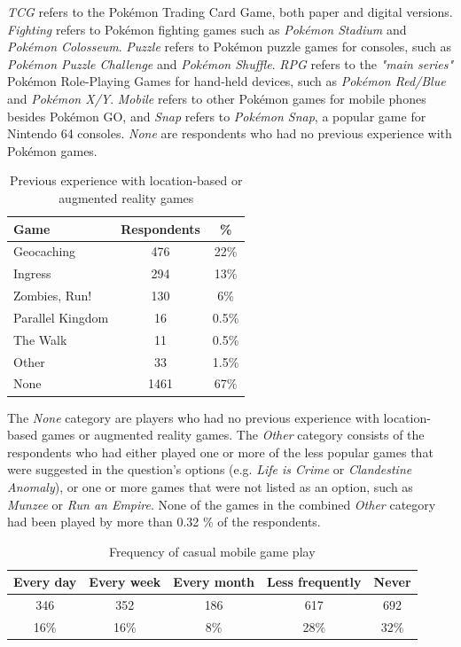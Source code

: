 \emph{TCG} refers to the Pokémon Trading Card Game, both paper and digital versions. \emph{Fighting} refers to Pokémon fighting games such as \emph{Pokémon Stadium} and \emph{Pokémon Colosseum}. \emph{Puzzle} refers to Pokémon puzzle games for consoles, such as \emph{Pokémon Puzzle Challenge} and \emph{Pokémon Shuffle}. \emph{RPG} refers to the \emph{"main series"} Pokémon Role-Playing Games for hand-held devices, such as \emph{Pokémon Red/Blue} and \emph{Pokémon X/Y}. \emph{Mobile} refers to other Pokémon games for mobile phones besides Pokémon GO, and \emph{Snap} refers to \emph{Pokémon Snap}, a popular game for Nintendo 64 consoles. \emph{None} are respondents who had no previous experience with Pokémon games.

\begin{table}[h]
	\centering
	\caption{Previous experience with location-based or augmented reality games}
	\label{tbl:location-ar-games-experience}
	\begin{tabular}{|l|c|c|}
		\hline
		\textbf{Game}		& \textbf{Respondents} & \textbf{\%}\\
		\hline\hline
		Geocaching			& 476	& 22\%\\\hline
		Ingress				& 294	& 13\%\\\hline
		Zombies, Run!		& 130	& 6\%\\\hline
		Parallel Kingdom	& 16	& 0.5\%\\\hline
		The Walk			& 11	& 0.5\%\\\hline
		Other				& 33	& 1.5\%\\\hline
		None				& 1461	& 67\%\\\hline
	\end{tabular}
\end{table}

The \emph{None} category are players who had no previous experience with location-based games or augmented reality games. The \emph{Other} category consists of the respondents who had either played one or more of the less popular games that were suggested in the question's options (e.g. \emph{Life is Crime} or \emph{Clandestine Anomaly}), or one or more games that were not listed as an option, such as \emph{Munzee} or \emph{Run an Empire}. None of the games in the combined \emph{Other} category had been played by more than 0.32 \% of the respondents.

\begin{table}[h]
	\centering
	\caption{Frequency of casual mobile game play}
	\label{tbl:mobile-games-experience}
	\begin{tabular}{|c|c|c|c|c|}
		\hline
		\textbf{Every day} & \textbf{Every week} & \textbf{Every month} & \textbf{Less frequently} & \textbf{Never}\\
		\hline\hline
		346	& 352	& 186	& 617	& 692\\
		16\%& 16\%	& 8\%	& 28\%	& 32\%\\\hline
	\end{tabular}
\end{table}

